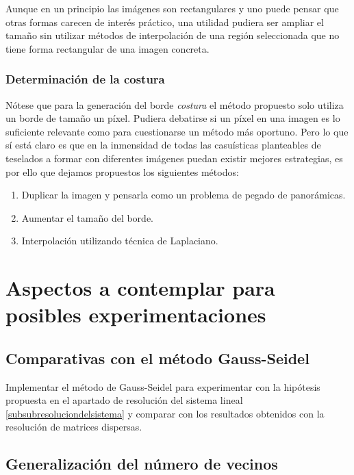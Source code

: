 \documentclass[11pt,twoside,titlepage,a4paper]{article}
\numberwithin{equation}{section} %
\theoremstyle{usual}
\begin{document}
Aunque en un principio las imágenes son rectangulares y uno puede pensar que otras formas carecen de interés práctico, una utilidad pudiera ser ampliar el tamaño sin utilizar métodos de interpolación de una región seleccionada que no tiene forma rectangular de una imagen concreta. 

\subsubsection{Determinación de la costura}

Nótese que para la generación del borde \textit{costura} el método propuesto solo utiliza un borde de tamaño un píxel. Pudiera debatirse si un píxel en una imagen es lo suficiente relevante como para cuestionarse un método más oportuno. Pero lo que sí está claro es que en la inmensidad de todas las casuísticas planteables de teselados a formar con diferentes imágenes puedan existir mejores estrategias, es por ello que dejamos propuestos los siguientes métodos: 

\begin{enumerate}
    \item Duplicar la imagen y pensarla como un problema de pegado de panorámicas. 
    \item Aumentar el tamaño del borde.
    \item Interpolación utilizando técnica de Laplaciano.
\end{enumerate}

\newpage

\section{Aspectos a contemplar para posibles experimentaciones}


\subsection{ Comparativas con el método Gauss-Seidel}

Implementar el método de Gauss-Seidel para experimentar con la hipótesis propuesta en el apartado de resolución del sistema lineal \ref{subsubresoluciondelsistema} y comparar con los resultados obtenidos con la resolución de matrices dispersas. 

\subsection{Generalización del número de vecinos} 
\end{document}
